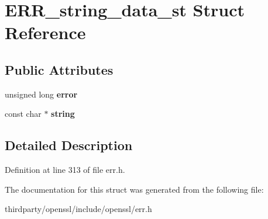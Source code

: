 \hypertarget{struct_e_r_r__string__data__st}{}\section{E\+R\+R\+\_\+string\+\_\+data\+\_\+st Struct Reference}
\label{struct_e_r_r__string__data__st}
\subsection*{Public Attributes}
\begin{DoxyCompactItemize}
\item 
\mbox{\label{struct_e_r_r__string__data__st_a31cec2470a4a78675d42e43bca29eb73}} 
unsigned long {\bfseries error}
\item 
\mbox{\label{struct_e_r_r__string__data__st_a8533e685b5daab9b3860db861e468361}} 
const char $\ast$ {\bfseries string}
\end{DoxyCompactItemize}


\subsection{Detailed Description}


Definition at line 313 of file err.\+h.



The documentation for this struct was generated from the following file\+:\begin{DoxyCompactItemize}
\item 
thirdparty/openssl/include/openssl/err.\+h\end{DoxyCompactItemize}
